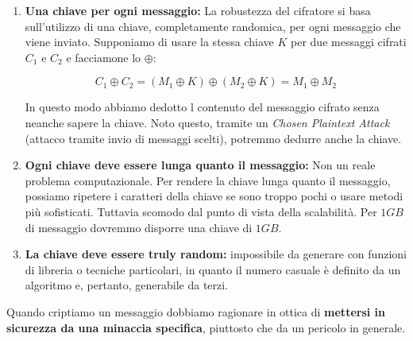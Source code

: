 \begin{enumerate}
    \item \textbf{Una chiave per ogni messaggio:} La robustezza del cifratore si basa sull'utilizzo di una chiave, completamente randomica, per ogni messaggio che viene inviato. Supponiamo di usare la stessa chiave $K$ per due messaggi cifrati $C_1$ e $C_2$ e facciamone lo $\oplus$:
    \begin{center}
    \vspace{-25pt}
        \begin{equation*}
            C_1\oplus{C_2}=(M_1\oplus{K})\oplus(M_2\oplus{K})=M_1\oplus{M_2}
        \end{equation*}
    \end{center}
    In questo modo abbiamo dedotto l contenuto del messaggio cifrato senza neanche sapere la chiave. Noto questo, tramite un \emph{Chosen Plaintext Attack} (attacco tramite invio di messaggi scelti), potremmo dedurre anche la chiave. 
    \item \textbf{Ogni chiave deve essere lunga quanto il messaggio:} Non un reale problema computazionale. Per rendere la chiave lunga quanto il messaggio, possiamo ripetere i caratteri della chiave se sono troppo pochi o usare metodi più sofisticati. Tuttavia scomodo dal punto di vista della scalabilità. Per $1GB$ di messaggio dovremmo disporre una chiave di $1GB$.
    \item \textbf{La chiave deve essere truly random:} impossibile da generare con funzioni di libreria o tecniche particolari, in quanto il numero casuale è definito da un algoritmo e, pertanto, generabile da terzi.
\end{enumerate}
\begin{corollary}
Quando criptiamo un messaggio dobbiamo ragionare in ottica di \textbf{mettersi in sicurezza da una minaccia specifica}, piuttosto che da un pericolo in generale.
\end{corollary}\pagebreak
